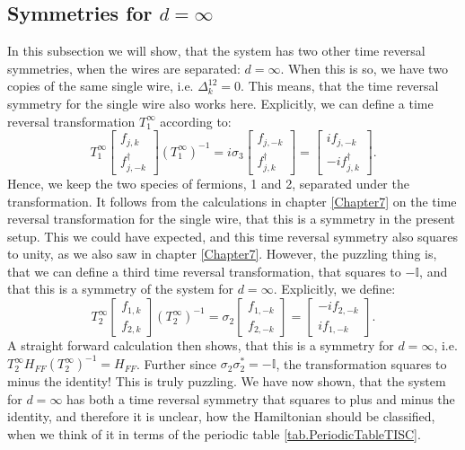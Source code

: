 \subsection{Symmetries for $d =\infty$}
In this subsection we will show, that the system has two other time reversal symmetries, when the wires are separated: $d = \infty$. When this is so, we have two copies of the same single wire, i.e. $\Delta^{12}_k = 0$. This means, that the time reversal symmetry for the single wire also works here. Explicitly, we can define a time reversal transformation $T_1^{\infty}$ according to:
\begin{equation}
T_1^{\infty} \begin{bmatrix} f_{j,k} \\ f^\dagger_{j,-k} \end{bmatrix} (T_1^{\infty})^{-1} = i\sigma_3\begin{bmatrix} f_{j,-k} \\ f^\dagger_{j,k} \end{bmatrix} = \begin{bmatrix} i f_{j,-k} \\ - i f^\dagger_{j,k} \end{bmatrix}.
\end{equation} 
Hence, we keep the two species of fermions, 1 and 2, separated under the transformation. It follows from the calculations in chapter \ref{Chapter7} on the time reversal transformation for the single wire, that this is a symmetry in the present setup. This we could have expected, and this time reversal symmetry also squares to unity, as we also saw in chapter \ref{Chapter7}. However, the puzzling thing is, that we can define a third time reversal transformation, that squares to $-\mathbb{I}$, and that this is a symmetry of the system for $d = \infty$. Explicitly, we define:
\begin{equation}
T_2^{\infty} \begin{bmatrix} f_{1,k} \\ f_{2,k} \end{bmatrix} (T_2^{\infty})^{-1} = \sigma_2\begin{bmatrix} f_{1,-k} \\ f_{2,-k} \end{bmatrix} = \begin{bmatrix} -i f_{2,-k} \\ i f_{1,-k} \end{bmatrix}.
\end{equation} 
A straight forward calculation then shows, that this is a symmetry for $d = \infty$, i.e. $T_2^{\infty}H_{FF} (T_2^{\infty})^{-1} = H_{FF}$. Further since $\sigma_2\sigma_2^* = -\mathbb{I}$, the transformation squares to minus the identity! This is truly puzzling. We have now shown, that the system for $d=\infty$ has both a time reversal symmetry that squares to plus and minus the identity, and therefore it is unclear, how the Hamiltonian should be classified, when we think of it in terms of the periodic table \ref{tab.PeriodicTableTISC}. 



